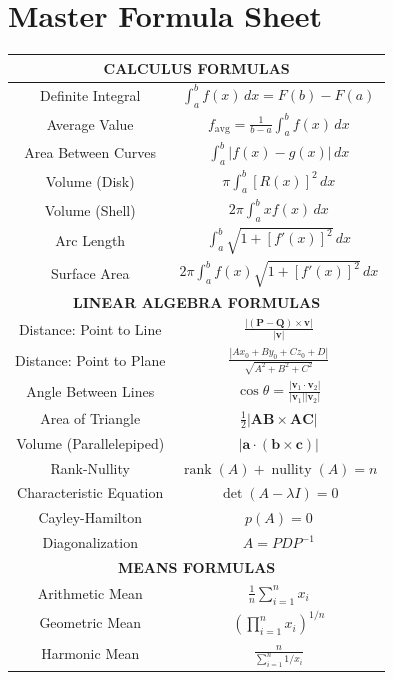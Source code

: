 \documentclass[12pt,a4paper]{article}
\providecommand{\rank}{\operatorname{rank}}
\providecommand{\nullity}{\operatorname{nullity}}
\begin{document}
\section{Master Formula Sheet}

\begin{center}
    \begin{tabular}{|c|c|}
        \hline
        \multicolumn{2}{|c|}{\textbf{\color{primary} CALCULUS FORMULAS}} \\
        \hline
        Definite Integral & \(\int_a^b f(x)\,dx = F(b)-F(a)\) \\
        Average Value & \(f_{\text{avg}} = \frac{1}{b-a}\int_a^b f(x)\,dx\) \\
        Area Between Curves & \(\int_a^b |f(x)-g(x)|\,dx\) \\
        Volume (Disk) & \(\pi\int_a^b [R(x)]^2\,dx\) \\
        Volume (Shell) & \(2\pi\int_a^b x f(x)\,dx\) \\
        Arc Length & \(\int_a^b \sqrt{1+[f'(x)]^2}\,dx\) \\
        Surface Area & \(2\pi\int_a^b f(x)\sqrt{1+[f'(x)]^2}\,dx\) \\
        \hline
        \multicolumn{2}{|c|}{\textbf{\color{primary} LINEAR ALGEBRA FORMULAS}} \\
        \hline
        Distance: Point to Line & \(\frac{|(\mathbf{P-Q})\times\mathbf{v}|}{|\mathbf{v}|}\) \\
        Distance: Point to Plane & \(\frac{|Ax_0+By_0+Cz_0+D|}{\sqrt{A^2+B^2+C^2}}\) \\
        Angle Between Lines & \(\cos\theta = \frac{|\mathbf{v}_1\cdot\mathbf{v}_2|}{|\mathbf{v}_1||\mathbf{v}_2|}\) \\
        Area of Triangle & \(\frac{1}{2}|\mathbf{AB}\times\mathbf{AC}|\) \\
        Volume (Parallelepiped) & \(|\mathbf{a}\cdot(\mathbf{b}\times\mathbf{c})|\) \\
        Rank-Nullity & \(\rank(A) + \nullity(A) = n\) \\
        Characteristic Equation & \(\det(A-\lambda I)=0\) \\
        Cayley-Hamilton & \(p(A)=0\) \\
        Diagonalization & \(A = PDP^{-1}\) \\
        \hline
        \multicolumn{2}{|c|}{\textbf{\color{primary} MEANS FORMULAS}} \\
        \hline
        Arithmetic Mean & \(\frac{1}{n}\sum_{i=1}^n x_i\) \\
        Geometric Mean & \((\prod_{i=1}^n x_i)^{1/n}\) \\
        Harmonic Mean & \(\frac{n}{\sum_{i=1}^n 1/x_i}\) \\
        \hline
    \end{tabular}
\end{center}
\end{document}
